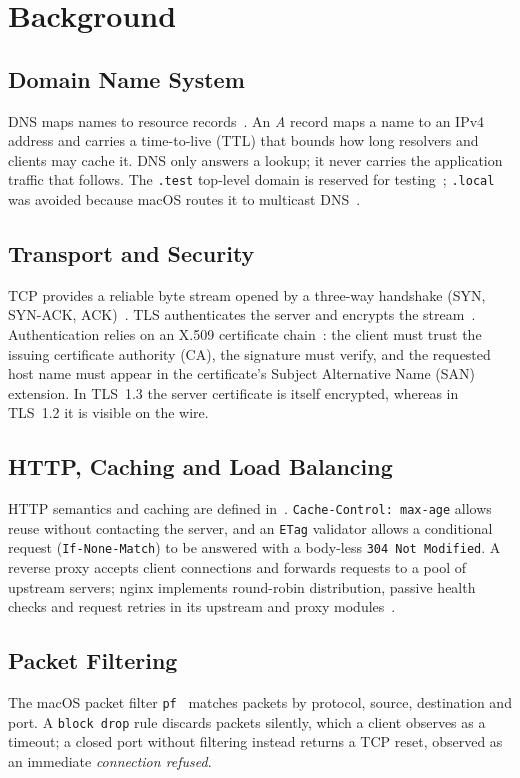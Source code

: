 \documentclass[conference,a4paper]{IEEEtran}
\newcommand{\code}[1]{\texttt{#1}}
\begin{document}
\section{Background}
\label{sec:bg}

\subsection{Domain Name System}
DNS maps names to resource records~\cite{rfc1034,rfc1035}. An \emph{A} record maps a name to an
IPv4 address and carries a time-to-live (TTL) that bounds how long resolvers and clients may
cache it. DNS only answers a lookup; it never carries the application traffic that follows. The
\code{.test} top-level domain is reserved for testing~\cite{rfc2606}; \code{.local} was avoided
because macOS routes it to multicast DNS~\cite{rfc6762}.

\subsection{Transport and Security}
TCP provides a reliable byte stream opened by a three-way handshake
(SYN, SYN-ACK, ACK)~\cite{rfc9293}. TLS authenticates the server and encrypts the
stream~\cite{rfc8446,rfc5246}. Authentication relies on an X.509 certificate chain~\cite{rfc5280}:
the client must trust the issuing certificate authority (CA), the signature must verify, and the
requested host name must appear in the certificate's Subject Alternative Name (SAN) extension.
In TLS~1.3 the server certificate is itself encrypted, whereas in TLS~1.2 it is visible on the
wire.

\subsection{HTTP, Caching and Load Balancing}
HTTP semantics and caching are defined in~\cite{rfc9110,rfc9111}. \code{Cache-Control: max-age}
allows reuse without contacting the server, and an \code{ETag} validator allows a conditional
request (\code{If-None-Match}) to be answered with a body-less \code{304 Not Modified}. A reverse
proxy accepts client connections and forwards requests to a pool of upstream servers; nginx
implements round-robin distribution, passive health checks and request retries in its upstream
and proxy modules~\cite{nginxup,nginxproxy}.

\subsection{Packet Filtering}
The macOS packet filter \code{pf}~\cite{pf} matches packets by protocol, source, destination and
port. A \code{block drop} rule discards packets silently, which a client observes as a timeout;
a closed port without filtering instead returns a TCP reset, observed as an immediate
\emph{connection refused}.
\end{document}
